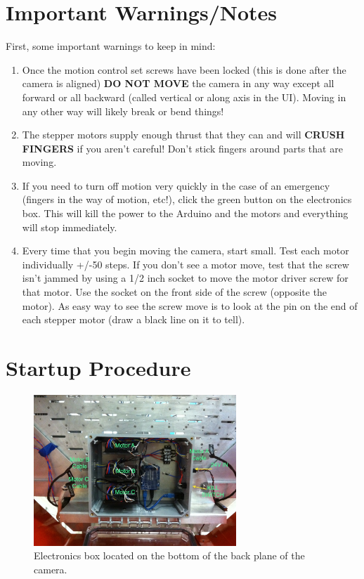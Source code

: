 \documentclass[11pt]{article}
\begin{document}
\section{Important Warnings/Notes}

First, some important warnings to keep in mind:
\begin{enumerate}
	\item Once the motion control set screws have been locked (this is done after the camera is aligned) {\bf DO NOT MOVE} the camera in any way except all forward or all backward (called vertical or along axis in the UI).
	Moving in any other way will likely break or bend things!
	\item The stepper motors supply enough thrust that they can and will {\bf CRUSH FINGERS} if you aren't careful!  Don't stick fingers around parts that are moving.
	\item If you need to turn off motion very quickly in the case of an emergency (fingers in the way of motion, etc!), click the green button on the electronics box.
		 This will kill the power to the Arduino and the motors and everything will stop immediately.
	\item Every time that you begin moving the camera, start small.  Test each motor individually +/-50 steps.  
		If you don't see a motor move, test that the screw isn't jammed by using a 1/2 inch socket to move the motor driver screw for that motor.
		Use the socket on the front side of the screw (opposite the motor).
		As easy way to see the screw move is to look at the pin on the end of each stepper motor (draw a black line on it to tell).
\end{enumerate}


\section{Startup Procedure}

\begin{figure}[h]
\begin{center}
\includegraphics[width = 3.0in]{elecBox.JPG}
\caption{Electronics box located on the bottom of the back plane of the camera.}  
\label{FigElecBox}
\end{center}
\end{figure}
\end{document}
